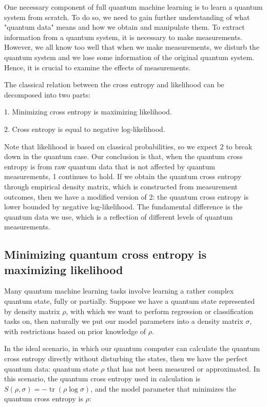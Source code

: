 \documentclass[11pt]{article}
\theoremstyle{definition}
\DeclareMathOperator{\tr}{\text{tr}}
\begin{document}
One necessary component of full quantum machine learning is to learn a quantum system from scratch. To do so, we need to gain further understanding of what "quantum data" means and how we obtain and manipulate them. To extract information from a quantum system, it is necessary to make measurements. However, we all know too well that when we make measurements, we disturb the quantum system and we lose some information of the original quantum system. Hence, it is crucial to examine the effects of measurements. 

The classical relation between the cross entropy and likelihood can be decomposed into two parts:

1. Minimizing cross entropy is maximizing likelihood.

2. Cross entropy is equal to negative log-likelihood.

Note that likelihood is based on classical probabilities, so we expect 2 to break down in the quantum case. Our conclusion is that, when the quantum cross entropy is from raw quantum data that is not affected by quantum measurements, 1 continues to hold. If we obtain the quantum cross entropy through empirical density matrix, which is constructed from measurement outcomes, then we have a modified version of 2: the quantum cross entropy is lower bounded by negative log-likelihood. The fundamental difference is the quantum data we use, which is a reflection of different levels of quantum measurements.


\subsection{Minimizing quantum cross entropy is maximizing likelihood}

Many quantum machine learning tasks involve learning a rather complex quantum state, fully or partially. Suppose we have a quantum state represented by density matrix $\rho$, with which we want to perform regression or classification tasks on, then naturally we put our model parameters into a density matrix $\sigma$, with restrictions based on prior knowledge of $\rho$.

In the ideal scenario, in which our quantum computer can calculate the quantum cross entropy directly without disturbing the states, then we have the perfect quantum data: quantum state $\rho$ that has not been measured or approximated. In this scenario, the quantum cross entropy used in calculation is $S(\rho, \sigma) = -\tr (\rho \log \sigma)$, and the model parameter that minimizes the quantum cross entropy is $\rho$:
\end{document}
